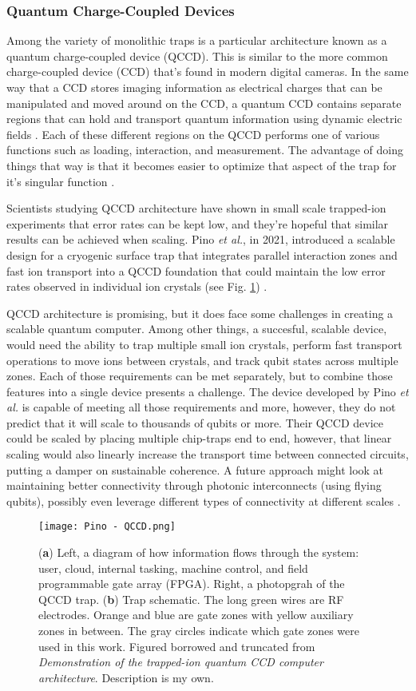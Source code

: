 \subsubsection{Quantum Charge-Coupled Devices}
Among the variety of monolithic traps is a particular architecture known as a quantum charge-coupled device (QCCD). This is similar to the more common charge-coupled device (CCD) that's found in modern digital cameras. In the same way that a CCD stores imaging information as electrical charges that can be manipulated and moved around on the CCD, a quantum CCD contains separate regions that can hold and transport quantum information using dynamic electric fields \cite{Pino}. Each of these different regions on the QCCD performs one of various functions such as loading, interaction, and measurement. The advantage of doing things that way is that it becomes easier to optimize that aspect of the trap for it's singular function \cite{Bruzewicz}.

Scientists studying QCCD architecture have shown in small scale trapped-ion experiments that error rates can be kept low, and they're hopeful that similar results can be achieved when scaling. Pino \textit{et al.}, in 2021, introduced a scalable design for a cryogenic surface trap that integrates parallel interaction zones and fast ion transport into a QCCD foundation that could maintain the low error rates observed in individual ion crystals (see Fig. \ref{fig:QCCD}) \cite{Pino}.

QCCD architecture is promising, but it does face some challenges in creating a scalable quantum computer. Among other things, a succesful, scalable device, would need the ability to trap multiple small ion crystals, perform fast transport operations to move ions between crystals, and track qubit states across multiple zones. Each of those requirements can be met separately, but to combine those features into a single device presents a challenge. The device developed by Pino \textit{et al.} is capable of meeting all those requirements and more, however, they do not predict that it will scale to thousands of qubits or more. Their QCCD device could be scaled by placing multiple chip-traps end to end, however, that linear scaling would also linearly increase the transport time between connected circuits, putting a damper on sustainable coherence. A future approach might look at maintaining better connectivity through photonic interconnects (using flying qubits), possibly even leverage different types of connectivity at different scales \cite{Pino}.
\begin{figure}
    \texttt{[image: Pino - QCCD.png]}
    \caption{(\textbf{a}) Left, a diagram of how information flows through the system: user, cloud, internal tasking, machine control, and field programmable gate array (FPGA). Right, a photopgrah of the QCCD trap. (\textbf{b}) Trap schematic. The long green wires are RF electrodes. Orange and blue are gate zones with yellow auxiliary zones in between. The gray circles indicate which gate zones were used in this work. Figured borrowed and truncated from \textit{Demonstration of the trapped-ion quantum CCD computer architecture}. Description is my own.}
    \label{fig:QCCD}
\end{figure}